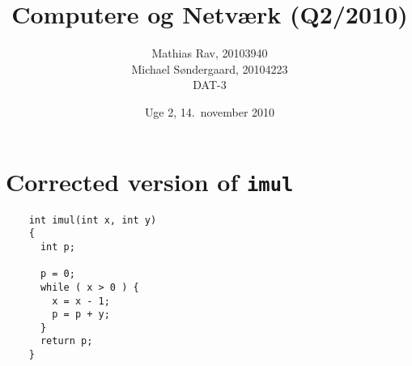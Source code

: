 \documentclass[12pt,a4paper]{article}
\title{Computere og Netværk (Q2/2010)}
\author{Mathias Rav, 20103940 \\
		Michael Søndergaard, 20104223 \\
		DAT-3}
\date{Uge 2, 14.\ november 2010}
\newcommand{\imul}{\texttt{imul}}
\begin{document}
\maketitle

\section{Corrected version of \imul}

\begin{lstlisting}
	int imul(int x, int y)
	{ 
	  int p;
	    
	  p = 0;
	  while ( x > 0 ) {
	    x = x - 1;
	    p = p + y;
	  }
	  return p;
	}
\end{lstlisting}
\end{document}

